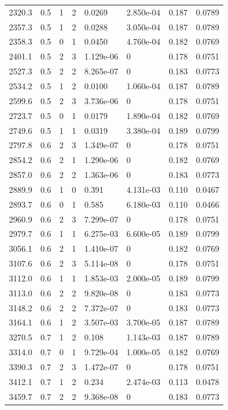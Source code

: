 \documentclass[preview]{standalone}
\begin{document}
{{{\begin{tabular}{L{1.2cm}C{1.2cm} C{0.3cm}C{0.5cm} C{1.4cm}C{1.4cm} C{1.4cm}C{1.4cm}}
  2320.3  &   0.5  & 1     &  2 &  0.0269  & 2.850e-04  & 0.187 &  0.0789   \\ 
  2357.3  &   0.5  & 1     &  2 &  0.0288  & 3.050e-04  & 0.187 &  0.0789   \\ 
  2358.3  &   0.5  & 0     &  1 &  0.0450  & 4.760e-04  & 0.182 &  0.0769   \\ 
  2401.1  &   0.5  & 2     &  3 &  1.129e-06  & 0  & 0.178 &  0.0751   \\ 
  2527.3  &   0.5  & 2     &  2 &  8.265e-07  & 0  & 0.183 &  0.0773   \\ 
  2534.2  &   0.5  & 1     &  2 &  0.0100  & 1.060e-04  & 0.187 &  0.0789   \\ 
  2599.6  &   0.5  & 2     &  3 &  3.736e-06  & 0  & 0.178 &  0.0751   \\ 
  2723.7  &   0.5  & 0     &  1 &  0.0179  & 1.890e-04  & 0.182 &  0.0769   \\ 
  2749.6  &   0.5  & 1     &  1 &  0.0319  & 3.380e-04  & 0.189 &  0.0799   \\ 
  2797.8  &   0.6  & 2     &  3 &  1.349e-07  & 0  & 0.178 &  0.0751   \\ 
  2854.2  &   0.6  & 2     &  1 &  1.290e-06  & 0  & 0.182 &  0.0769   \\ 
  2857.0  &   0.6  & 2     &  2 &  1.363e-06  & 0  & 0.183 &  0.0773   \\ 
  2889.9  &   0.6  & 1     &  0 &  0.391  & 4.131e-03  & 0.110 &  0.0467   \\ 
  2893.7  &   0.6  & 0     &  1 &  0.585  & 6.180e-03  & 0.110 &  0.0466   \\ 
  2960.9  &   0.6  & 2     &  3 &  7.299e-07  & 0  & 0.178 &  0.0751   \\ 
  2979.7  &   0.6  & 1     &  1 &  6.275e-03  & 6.600e-05  & 0.189 &  0.0799   \\ 
  3056.1  &   0.6  & 2     &  1 &  1.410e-07  & 0  & 0.182 &  0.0769   \\ 
  3107.6  &   0.6  & 2     &  3 &  5.114e-08  & 0  & 0.178 &  0.0751   \\ 
  3112.0  &   0.6  & 1     &  1 &  1.853e-03  & 2.000e-05  & 0.189 &  0.0799   \\ 
  3113.0  &   0.6  & 2     &  2 &  9.820e-08  & 0  & 0.183 &  0.0773   \\ 
  3148.2  &   0.6  & 2     &  2 &  7.372e-07  & 0  & 0.183 &  0.0773   \\ 
  3164.1  &   0.6  & 1     &  2 &  3.507e-03  & 3.700e-05  & 0.187 &  0.0789   \\ 
  3270.5  &   0.7  & 1     &  2 &  0.108  & 1.143e-03  & 0.187 &  0.0789   \\ 
  3314.0  &   0.7  & 0     &  1 &  9.729e-04  & 1.000e-05  & 0.182 &  0.0769   \\ 
  3390.3  &   0.7  & 2     &  3 &  1.472e-07  & 0  & 0.178 &  0.0751   \\ 
  3412.1  &   0.7  & 1     &  2 &  0.234  & 2.474e-03  & 0.113 &  0.0478   \\ 
  3459.7  &   0.7  & 2     &  2 &  9.368e-08  & 0  & 0.183 &  0.0773   \\ 
\hline 
\end{tabular} 

}}}
\end{document}
